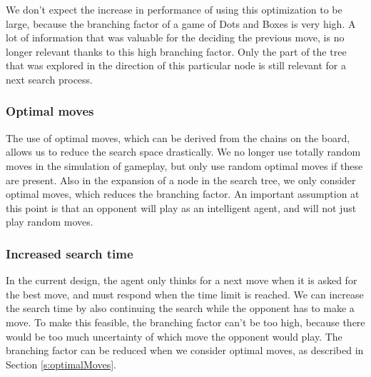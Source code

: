 	We don't expect the increase in performance of using this optimization to be large, because the branching factor of a game of Dots and Boxes is very high. A lot of information that was valuable for the deciding the previous move, is no longer relevant thanks to this high branching factor. Only the part of the tree that was explored in the direction of this particular node is still relevant for a next search process.
	
	\subsubsection{Optimal moves\label{s:optimalMoves}}
	The use of optimal moves, which can be derived from the chains on the board, allows us to reduce the search space drastically. We no longer use totally random moves in the simulation of gameplay, but only use random optimal moves if these are present. Also in the expansion of a node in the search tree, we only consider optimal moves, which reduces the branching factor.
	An important assumption at this point is that an opponent will play as an intelligent agent, and will not just play random moves. 
	
	\subsubsection{Increased search time}
	In the current design, the agent only thinks for a next move when it is asked for the best move, and must respond when the time limit is reached. We can increase the search time by also continuing the search while the opponent has to make a move. To make this feasible, the branching factor can't be too high, because there would be too much uncertainty of which move the opponent would play. The branching factor can be reduced when we consider optimal moves, as described in Section \ref{s:optimalMoves}.